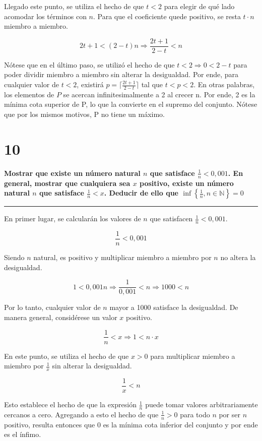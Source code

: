 \documentclass{article}
\newcommand{\sectionx}[1]{\section*{#1}\label{sec:#1}\addcontentsline{toc}{section}{\nameref{sec:#1}}}
\begin{document}
Llegado este punto, se utiliza el hecho de que $ t < 2 $ para elegir de qué lado acomodar los términos con $ n $. Para que el coeficiente quede positivo, se resta $ t \cdot n $ miembro a miembro.

\begin{equation}
2t + 1 < (2-t) n \Rightarrow \frac{2t+1}{2-t} < n
\end{equation}

Nótese que en el último paso, se utilizó el hecho de que $ t < 2 \Rightarrow 0 < 2-t $ para poder dividir miembro a miembro sin alterar la desigualdad. Por ende, para cualquier valor de $ t < 2$, existirá $ p = \lceil \frac{2t+1}{2-t} \rceil $ tal que $ t < p < 2$. En otras palabras, los elementos de $ P $ se acercan infinitesimalmente a 2 al crecer n. Por ende, 2 es la mínima cota superior de P, lo que la convierte en el supremo del conjunto. Nótese que por los mismos motivos, P no tiene un máximo.

\sectionx{10}

\textbf{Mostrar que existe un número natural $ n $ que satisface $ \frac{1}{n} < 0,001 $. En general, mostrar que cualquiera sea $ x $ positivo, existe un número natural $ n $ que satisface $ \frac{1}{n} < x $. Deducir de ello que $ \mathop{\text{inf}}\left\{ \frac{1}{n}, n \in \mathbb{N} \right\} = 0$}

\vspace{1em}
\hrule
\vspace{1em}

En primer lugar, se calcularán los valores de $ n $ que satisfacen $ \frac{1}{n} < 0,001 $.

\begin{equation}
\frac{1}{n} < 0,001
\end{equation}

Siendo $ n $ natural, es positivo y multiplicar miembro a miembro por $ n $ no altera la desigualdad.

\begin{equation}
1 < 0,001 n \Rightarrow \frac{1}{0,001} < n \Rightarrow 1000 < n
\end{equation}

Por lo tanto, cualquier valor de $ n $ mayor a 1000 satisface la desigualdad. De manera general, considérese un valor $ x $ positivo.

\begin{equation}
\frac{1}{n} < x \Rightarrow 1 < n \cdot x
\end{equation}

En este punto, se utiliza el hecho de que $ x > 0 $ para multiplicar miembro a miembro por $ \frac{1}{x} $ sin alterar la desigualdad.

\begin{equation}
\frac{1}{x} < n
\end{equation}

Esto establece el hecho de que la expresión $ \frac{1}{n} $ puede tomar valores arbitrariamente cercanos a cero. Agregando a esto el hecho de que $ \frac{1}{n} > 0 $ para todo $ n $ por ser $ n $ positivo, resulta entonces que 0 es la mínima cota inferior del conjunto y por ende es el ínfimo.
\end{document}
